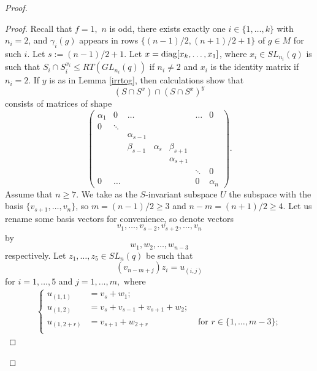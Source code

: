 \begin{proof}
\begin{proof}
Recall that $f=1, $ $n$ is odd, there exists exactly one $i \in \{1, \ldots, k\}$ with $n_i=2$, and $\gamma_i(g)$ appears in rows  $\{(n-1)/2,(n+1)/2+1\}$ of $g \in M$ for such $i$.   Let $s:=(n-1)/2+1$. Let $x= \mathrm{diag}[x_k, \ldots, x_1]$, where $x_i\in SL_{n_i}(q)$ is such that $S_i \cap S_i^{x_i} \le RT(GL_{n_i}(q))$ if $n_i \ne 2$ and $x_i$ is the identity matrix if $n_i=2.$ If $y$ is as in Lemma \ref{irrtog}, then  calculations show that  
$$(S \cap S^x) \cap (S \cap S^x)^y$$ consists of matrices of shape 
\begin{equation}\label{seredl} 
  \left(\begin{matrix} 
\alpha_1 &0       & \dots              &                  &                 &             \dots &0  \\
0        & \ddots &                    &                  &                 &                   &   \\
         &        & \alpha_{s-1}       &                  &                 &                   &   \\
         &        & \beta_{s-1}        &\alpha_{s}        &\beta_{s+1}      &                   &   \\
         &        &                    &                  &\alpha_{s+1   }  &                   &   \\
         &        &                    &                  &                 &\ddots             & 0  \\
 0       & \dots  &                    &                  &                 &     0             &\alpha_{n} 
\end{matrix} \right).
\end{equation}
Assume that $n \ge 7$. We take as the $S$-invariant subspace $U$ the subspace with the basis $\{v_{s+1}, \ldots, v_n\}$, so
$m=(n-1)/2 \ge 3$ and $n-m=(n+1)/2\ge 4.$  Let us rename some basis vectors for convenience, so denote vectors 
$$v_1, \ldots, v_{s-2}, v_{s+2}, \ldots, v_n$$ by $$w_1, w_2, \ldots, w_{n-3}$$ respectively.
Let  $z_1, \ldots, z_5 \in SL_n(q)$ be such that $$(v_{n-m+j})z_i=u_{(i,j)}$$ for $i=1, \ldots, 5$ and $j=1, \ldots, m,$ where
\begin{gather}\label{orb2l1}
\left\{ 
\begin{aligned}
u_{(1,1)} & = v_{s}+w_1;\\
u_{(1,2)} & = v_{s}+v_{s-1}+v_{s+1}+w_2;\\
u_{(1,2+r)} & =v_{s+1}+w_{2+r}\phantom{;} &\text{ for } r \in \{1, \ldots, m-3\};\\

\end{aligned}
\end{gather}
\end{proof}
\end{proof}
